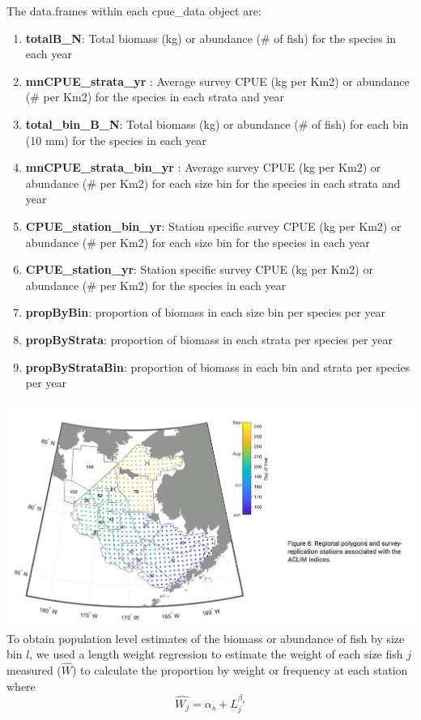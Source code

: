 \documentclass[
]{article}
\providecommand{\tightlist}{%
  \setlength{\itemsep}{0pt}\setlength{\parskip}{0pt}}
\begin{document}
The data.frames within each cpue\_data object are:

\begin{enumerate}
\def\labelenumi{\arabic{enumi}.}
\tightlist
\item
  \textbf{totalB\_N}: Total biomass (kg) or abundance (\# of fish) for
  the species in each year\\
\item
  \textbf{mnCPUE\_strata\_yr} : Average survey CPUE (kg per Km2) or
  abundance (\# per Km2) for the species in each strata and year\\
\item
  \textbf{total\_bin\_B\_N}: Total biomass (kg) or abundance (\# of
  fish) for each bin (10 mm) for the species in each year\\
\item
  \textbf{mnCPUE\_strata\_bin\_yr} : Average survey CPUE (kg per Km2) or
  abundance (\# per Km2) for each size bin for the species in each
  strata and year
\item
  \textbf{CPUE\_station\_bin\_yr}: Station specific survey CPUE (kg per
  Km2) or abundance (\# per Km2) for each size bin for the species in
  each year\\
\item
  \textbf{CPUE\_station\_yr}: Station specific survey CPUE (kg per Km2)
  or abundance (\# per Km2) for the species in each year\\
\item
  \textbf{propByBin}: proportion of biomass in each size bin per species
  per year\\
\item
  \textbf{propByStrata}: proportion of biomass in each strata per
  species per year
\item
  \textbf{propByStrataBin}: proportion of biomass in each bin and strata
  per species per year
\end{enumerate}

\includegraphics{figs/Kearney_2023.jpg} To obtain population level
estimates of the biomass or abundance of fish by size bin \(l\), we used
a length weight regression to estimate the weight of each size fish
\(j\) measured (\(\hat{W}\)) to calculate the proportion by weight or
frequency at each station where \[\hat{W_j} = \alpha_s+L_j^{\beta_s} \]
\end{document}
